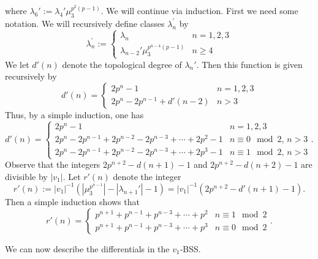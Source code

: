 where $\lambda_6':= \lambda_4'\mu_3^{p^2(p-1)}$. We will continue via induction. First we need some notation. We will recursively define classes $\lambda_n^{\prime}$ by 
\[
\lambda_n^{\prime}:= \begin{cases}
	\lambda_n & n=1,2,3\\
	\lambda_{n-2}'\mu_3^{p^{n-4}(p-1)} & n\geq 4
\end{cases}
\]
We let $d'(n)$ denote the topological degree of $\lambda_n'$. Then this function is given recursively by 
\[
d'(n) = \begin{cases}
	2p^n-1 & n=1,2,3\\
	2p^n-2p^{n-1}+d'(n-2) & n>3
\end{cases}
\]
Thus, by a simple induction, one has 
\[
d'(n) = \begin{cases}
	2p^n-1 & n=1,2,3\\
	2p^n-2p^{n-1}+2p^{n-2}-2p^{n-3}+\cdots + 2p^2-1 & n\equiv 0\mod 2,\, n>3\\
	2p^n-2p^{n-1}+ 2p^{n-2}-2p^{n-3}+\cdots + 2p^3-1& n\equiv 1\mod 2, \, n>3
\end{cases}.
\]
Observe that the integers $2p^{n+2}-d(n+1)-1$ and $2p^{n+2}-d(n+2)-1$ are divisible by $|v_1|$. Let $r'(n)$ denote the integer 
\[
r'(n):=|v_1|^{-1}(|\mu_3^{p^{n-1}}|-|\lambda_{n+1}'|-1)=|v_1|^{-1}(2p^{n+2}-d'(n+1)-1).
\] 
Then a simple induction shows that 
\[
r'(n) = \begin{cases}
	p^{n+1}+p^{n-1}+p^{n-3} +\cdots + p^2 & n\equiv 1 \mod 2\\
	p^{n+1}+p^{n-1}+p^{n-3}+\cdots + p^3 & n\equiv 0 \mod 2
\end{cases}.
\]



We can now describe the differentials in the $v_1$-BSS. 


